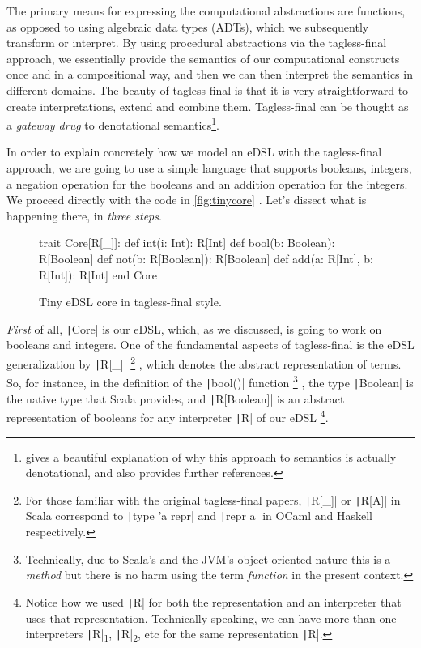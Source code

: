 \documentclass[11pt]{article}
\renewcommand{\vref}[1]{\autoref{#1} \vpageref{#1}}{}
\newcommand{\Scala}[1]{\texttt|#1|}
\newcommand{\ScalaI}[1]{\texttt|#1|}
\newcommand{\TextI}[1]{\texttt|#1|}
\newcommand{\OneTwoThreeX}[1]{\marginpar{\faCubes{ \smaller #1}}\xspace}
\newcommand{\OneTwoThree}{\OneTwoThreeX{}}
\newcommand{\FirstEtcX}[1]{\marginpar{\faCube{ \smaller #1}}\xspace}
\newcommand{\FirstEtc}{\FirstEtcX{}}
\begin{document}
The primary means for expressing the computational abstractions are 
functions, as opposed to using algebraic data types (ADTs), which we 
subsequently transform or interpret. By using procedural abstractions via the 
tagless-final approach, we essentially provide the semantics of our 
computational constructs once and in a compositional way, and then we can 
then interpret the semantics in different domains. The beauty of tagless 
final is that it is very straightforward to create interpretations, extend 
and combine them. Tagless-final can be thought as a \textit{gateway drug} to 
denotational 
semantics\cite{wiki:denotational-semantics}\cite{eff:OCaml:2018}\footnote{%
\cite[Section~3.1.4]{eff:OCaml:2018} gives a beautiful explanation of why 
this approach to semantics is actually denotational, and also provides 
further references.}.

In order to explain concretely how we model an eDSL with the tagless-final 
approach, we are going to use a simple language that supports booleans, 
integers, a negation operation for the booleans and an addition operation for 
the integers. We proceed directly with the code in \vref{fig:tinycore}. Let's 
dissect what is happening there, in \textit{three steps}\OneTwoThree.

\begin{figure}[t]
\begin{ScalaBlock}
trait Core[R[_]]:
  def int(i: Int): R[Int]
  def bool(b: Boolean): R[Boolean]
  def not(b: R[Boolean]): R[Boolean]
  def add(a: R[Int], b: R[Int]): R[Int]
end Core
\end{ScalaBlock}
\caption{Tiny eDSL core in tagless-final style.}
\label{fig:tinycore}
\hrulefill
\end{figure}

\textit{First}\FirstEtc of all, \Scala{Core} is our eDSL, which, as we 
discussed, is going to work on booleans and integers. One of the fundamental 
aspects of tagless-final is the eDSL generalization by \Scala{R[_]}%
\footnote{For those familiar with the original tagless-final papers, 
\ScalaI{R[_]} or \ScalaI{R[A]} in Scala correspond to \TextI{type 'a repr} 
and \TextI{repr a} in OCaml and Haskell respectively.}%
, which denotes the abstract representation of terms. So, for instance, in 
the definition of the \Scala{bool()} function%
\footnote{Technically, due to Scala's and the JVM's object-oriented nature 
this is a \textit{method} but there is no harm using the term 
\textit{function} in the present context.}
, the type \Scala{Boolean} is the native type that Scala provides, and 
\Scala{R[Boolean]} is an abstract representation of booleans for any 
interpreter \ScalaI{R} of our eDSL%
\footnote{Notice how we used \ScalaI{R} for both the representation and an 
interpreter that uses that representation. Technically speaking, we can have 
more than one interpreters \ScalaI{R}\textsubscript{1}, 
\ScalaI{R}\textsubscript{2}, etc for the same representation \ScalaI{R}.}.
\end{document}
